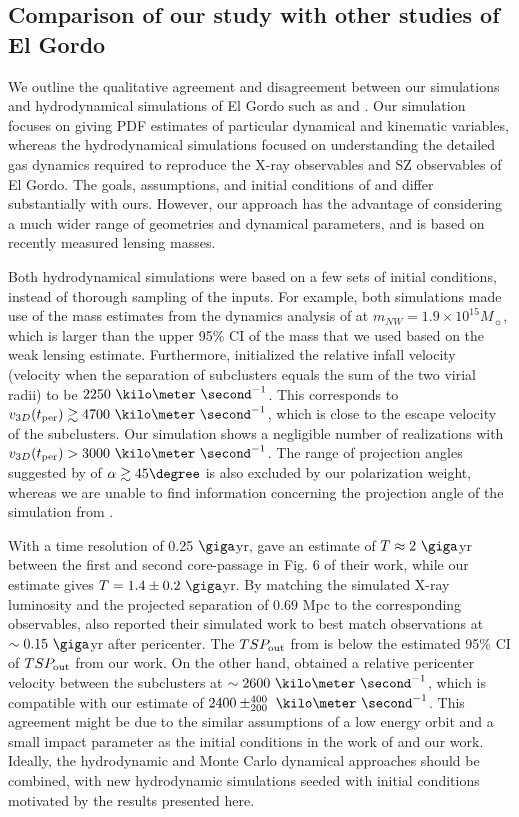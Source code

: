 \documentclass[letterpaper,useAMS,usenatbib]{mn2e}
\begin{document}
\subsection{Comparison of our study with other studies of El Gordo}
We outline the qualitative agreement and disagreement between our
simulations and hydrodynamical simulations of El Gordo such as
\cite{Donnert13} and \cite{Molnar14}. Our simulation focuses on giving PDF
estimates of particular dynamical and kinematic variables, whereas the
hydrodynamical simulations focused on understanding the detailed gas dynamics
required to reproduce the X-ray observables and SZ 
observables of El Gordo. The goals,
assumptions, and initial conditions of \cite{Donnert13} and \cite{Molnar14}
differ substantially with ours. However, our approach has the advantage of considering a much wider range of geometries and dynamical parameters, and is based on recently measured lensing masses.
\par 
Both hydrodynamical simulations were based on a few sets of initial
conditions, instead of thorough sampling of the inputs. For example, both
simulations made use of the mass estimates from the dynamics analysis
of  at $m_{NW} = 1.9 \times
10^{15} M_{\sun}$,
which is larger than the upper 95\% CI of the mass that we used based on
the weak lensing estimate.
Furthermore, \cite{Molnar14} initialized the relative infall velocity
(velocity when the separation of subclusters equals the sum of the two virial
radii) to be $2250~\kilo \meter~ \second^{-1}$. This corresponds to
$v_{3D}(t_{\rm per}) \gtrsim 4700~\kilo \meter~\second^{-1}$, which is close to
the escape velocity of the subclusters. 
Our simulation shows 
a negligible number of realizations with $v_{3D}(t_{\rm per}) >
3000~\kilo\meter~\second^{-1}$. 
The range of projection angles suggested by
\cite{Molnar14} of $\alpha \gtrsim 45\degree$ is also excluded by our
polarization weight, whereas we are unable to find information concerning
the projection angle of the simulation from \cite{Donnert13}.\par 
With a time resolution of 0.25 $\giga$yr,
\cite{Donnert13} gave an estimate of  $T\approx 2~\giga$yr between the
first and second core-passage in Fig. 6 of their work, while our estimate gives $T
= 1.4\pm {0.2}~\giga$yr. 
By matching the simulated X-ray luminosity and the projected separation
of $0.69$ Mpc to the corresponding observables, \cite{Donnert13} also reported their simulated work 
to best match  observations at $\sim 0.15~\giga$yr after pericenter. 
The $TSP_{\rm out}$ from \cite{Donnert13} is below the estimated 95\% CI of
$TSP_{\rm out}$ from our work.
On the other hand, \cite{Donnert13} obtained a
relative pericenter velocity between the subclusters at $\sim
2600~\kilo\meter~\second^{-1}$, which is compatible with our estimate of
$2400\pm^{400}_{200}~\kilo\meter~\second^{-1}$.  
This agreement might be due to the similar assumptions of a low
energy orbit and a small impact parameter as the initial conditions in the
work of \cite{Donnert13} and our work. 
Ideally, the hydrodynamic and Monte Carlo dynamical approaches should be combined, with new hydrodynamic simulations seeded with initial conditions motivated by the results presented here.
\end{document}
